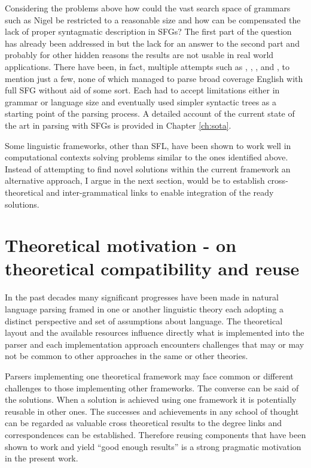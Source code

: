 Considering the problems above how could the vast search space of grammars such as Nigel be restricted to a reasonable size and how can be compensated the lack of proper syntagmatic description in SFGs? The first part of the question has already been addressed in \citet{ODonnell1993} but the lack for an answer to the second part and probably for other hidden reasons the results are not usable in real world applications. There have been, in fact, multiple attempts such as \citet{Kasper1988}, \citet{Kay1985}, \citet{ODonoghue1991a}, \citet{ODonnell1993} and \citet{Day2007}, to mention just a few, none of which managed to parse broad coverage English with full SFG without aid of some sort. Each had to accept limitations either in grammar or language size and eventually used simpler syntactic trees as a starting point of the parsing process. A detailed account of the current state of the art in parsing with SFGs is provided in Chapter \ref{ch:sota}. 

Some linguistic frameworks, other than SFL, have been shown to work well in computational contexts solving problems similar to the ones identified above. Instead of attempting to find novel solutions within the current framework an alternative approach, I argue in the next section, would be to establish cross-theoretical and inter-grammatical links to enable integration of the ready solutions.

\section{Theoretical motivation - on theoretical compatibility and reuse}
\label{sec:reuse}

In the past decades many significant progresses have been made in natural language parsing framed in one or another linguistic theory each adopting a distinct perspective and set of assumptions about language. The theoretical layout and the available resources influence directly what is implemented into the parser and each implementation approach encounters challenges that may or may not be common to other approaches in the same or other theories. 

Parsers implementing one theoretical framework may face common or different challenges to those implementing other frameworks. The converse can be said of the solutions. When a solution is achieved using one framework it is potentially reusable in other ones. The successes and achievements in any school of thought can be regarded as valuable cross theoretical results to the degree links and correspondences can be established. Therefore reusing components that have been shown to work and yield ``good enough results'' is a strong pragmatic motivation in the present work.

